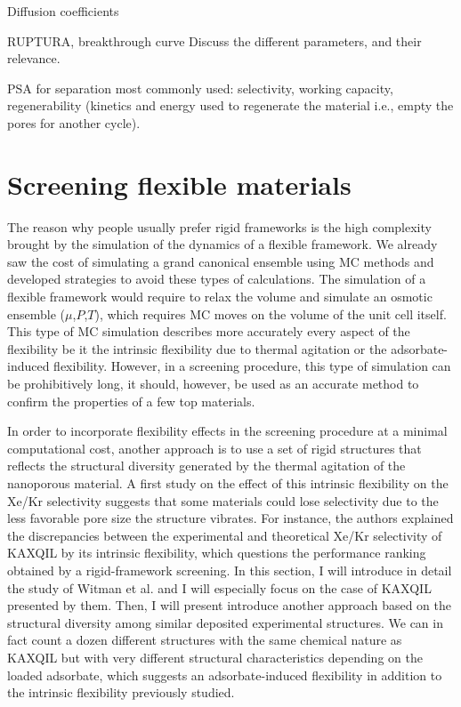 \documentclass[main]{subfiles}
\begin{document}
Diffusion coefficients 

RUPTURA, breakthrough curve
Discuss the different parameters, and their relevance.

PSA for separation most commonly used: selectivity, working capacity, regenerability (kinetics and energy used to regenerate the material i.e., empty the pores for another cycle).\autocite{Kumar_1994}

\section{Screening flexible materials}

The reason why people usually prefer rigid frameworks is the high complexity brought by the simulation of the dynamics of a flexible framework. We already saw the cost of simulating a grand canonical ensemble using MC methods and developed strategies to avoid these types of calculations. The simulation of a flexible framework would require to relax the volume and simulate an osmotic ensemble ($\mu$,$P$,$T$), which requires MC moves on the volume of the unit cell itself.\autocite{Bousquet2012} This type of MC simulation describes more accurately every aspect of the flexibility be it the intrinsic flexibility due to thermal agitation or the adsorbate-induced flexibility. However, in a screening procedure, this type of simulation can be prohibitively long, it should, however, be used as an accurate method to confirm the properties of a few top materials. 

In order to incorporate flexibility effects in the screening procedure at a minimal computational cost, another approach is to use a set of rigid structures that reflects the structural diversity generated by the thermal agitation of the nanoporous material. A first study on the effect of this intrinsic flexibility on the Xe/Kr selectivity suggests that some materials could lose selectivity due to the less favorable pore size the structure vibrates.\autocite{Witman_2017} For instance, the authors explained the discrepancies between the experimental and theoretical Xe/Kr selectivity of KAXQIL\autocite{KAXQIL} by its intrinsic flexibility, which questions the performance ranking obtained by a rigid-framework screening. In this section, I will introduce in detail the study of Witman et al.\autocite{Witman_2017} and I will especially focus on the case of KAXQIL presented by them. Then, I will present introduce another approach based on the structural diversity among similar deposited experimental structures. We can in fact count a dozen different structures with the same chemical nature as KAXQIL but with very different structural characteristics depending on the loaded adsorbate, which suggests an adsorbate-induced flexibility in addition to the intrinsic flexibility previously studied. 
\end{document}
